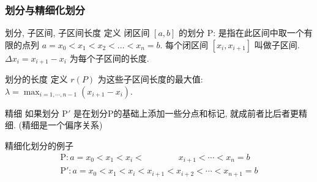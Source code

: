 \documentclass[
10pt,
aspectratio=43,
]{beamer}
\begin{document}
\begin{frame}
	\frametitle{划分与精细化划分}
	\pause
	\begin{block}{划分, 子区间, 子区间长度}
		定义 闭区间 $[a, b]$ 的划分 $\mathrm{P}$: 是指在此区间中取一个有限的点列 $a=x_0<x_1<x_2<\ldots<x_n=b$. 每个闭区间 $\left[x_i, x_{i+1}\right]$ 叫做子区间. $\Delta x_i = x_{i+1}- x_i$ 为每个子区间的长度.
	\end{block}
	\vspace{0.2cm}
	\pause
	\begin{block}{划分的长度}
		定义 $r(P)$ 为这些子区间长度的最大值: $\displaystyle\lambda=\max_{i=1,\cdots ,n-1} \left(x_{i+1}-x_i\right)$.
	\end{block}
	\vspace{0.2cm}
	\pause
	\begin{block}{精细}
		如果划分 $\mathrm{P}'$ 是在划分$\mathrm{P}$的基础上添加一些分点和标记, 就成前者比后者更精细. (精细是一个偏序关系)
	\end{block}
	\pause
	精细化划分的例子
	\begin{align*}
		\mathrm{P}:a=x_0<x_1<x_i<\qquad \qquad x_{i+1}<\cdots<x_n=b \\
		\mathrm{P}':a=x_0<x_1<x_i<x_{i+1}<x_{i+2}<\cdots<x_{n+1}=b
	\end{align*}
\end{frame}
\end{document}
